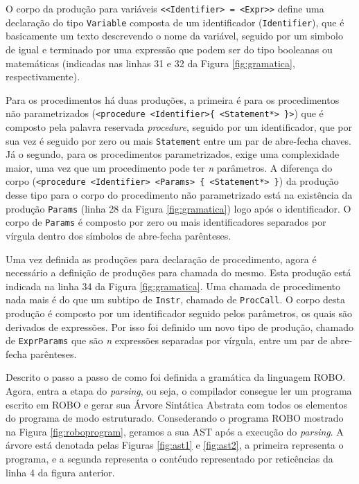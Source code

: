 O corpo da produção para variáveis \texttt{<<Identifier> = <Expr>>} define uma declaração do tipo \texttt{Variable} composta de um identificador (\texttt{Identifier}), que é basicamente um texto descrevendo o nome da variável, seguido por um simbolo de igual e terminado por uma expressão que podem ser do tipo booleanas ou matemáticas (indicadas nas linhas 31 e 32 da Figura \ref{fig:gramatica}, respectivamente).

Para os procedimentos há duas produções, a primeira é para os procedimentos não parametrizados (\texttt{<proce\-dure <Identifier>\{ <Statement*> \}>}) que é composto pela palavra reservada \textit{procedure}, seguido por um identificador, que por sua vez é seguido por zero ou mais \texttt{Statement} entre um par de abre-fecha chaves. Já o segundo, para os procedimentos parametrizados, exige uma complexidade maior, uma vez que um procedimento pode ter \textit{n} parâmetros. A diferença do corpo (\texttt{<procedure <Identifier> <Params> \{ <Statement*> \}}) da produção desse tipo para o corpo do procedimento não parametrizado está na existência da produção \texttt{Params} (linha 28 da Figura \ref{fig:gramatica}) logo após o identificador. O corpo de \texttt{Params} é composto por zero ou mais identificadores separados por vírgula dentro dos símbolos de abre-fecha parênteses.

Uma vez definida as produções para declaração de procedimento, agora é necessário a definição de produções para chamada do mesmo. Esta produção está indicada na linha 34 da Figura \ref{fig:gramatica}. Uma chamada de procedimento nada mais é do que um subtipo de \texttt{Instr}, chamado de \texttt{ProcCall}. O corpo desta produção é composto por um identificador seguido pelos parâmetros, os quais são derivados de expressões. Por isso foi definido um novo tipo de produção, chamado de \texttt{ExprParams} que são \textit{n} expressões separadas por vírgula, entre um par de abre-fecha parênteses.

Descrito o passo a passo de como foi definida a gramática da linguagem ROBO. Agora, entra a etapa do \textit{parsing}, ou seja, o compilador consegue ler um programa escrito em ROBO e gerar sua Árvore Sintática Abstrata com todos os elementos do programa de modo estruturado. Consederando o programa ROBO mostrado na Figura \ref{fig:roboprogram}, geramos a sua AST após a execução do \textit{parsing}. A árvore está denotada pelas Figuras \ref{fig:ast1} e \ref{fig:ast2}, a primeira representa o programa, e a segunda representa o contéudo representado por reticências da linha 4 da figura anterior.

